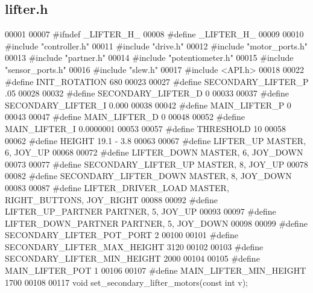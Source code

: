 \subsection{lifter.\+h}
\label{a00026_source}

\begin{DoxyCode}
00001 
00007 \textcolor{preprocessor}{#ifndef \_LIFTER\_H\_}
00008 \textcolor{preprocessor}{#define \_LIFTER\_H\_}
00009 
00010 \textcolor{preprocessor}{#include "controller.h"}
00011 \textcolor{preprocessor}{#include "drive.h"}
00012 \textcolor{preprocessor}{#include "motor_ports.h"}
00013 \textcolor{preprocessor}{#include "partner.h"}
00014 \textcolor{preprocessor}{#include "potentiometer.h"}
00015 \textcolor{preprocessor}{#include "sensor_ports.h"}
00016 \textcolor{preprocessor}{#include "slew.h"}
00017 \textcolor{preprocessor}{#include <API.h>}
00018 
00022 \textcolor{preprocessor}{#define INIT\_ROTATION 680}
00023 
00027 \textcolor{preprocessor}{#define SECONDARY\_LIFTER\_P .05}
00028 
00032 \textcolor{preprocessor}{#define SECONDARY\_LIFTER\_D 0}
00033 
00037 \textcolor{preprocessor}{#define SECONDARY\_LIFTER\_I 0.000}
00038 
00042 \textcolor{preprocessor}{#define MAIN\_LIFTER\_P 0}
00043 
00047 \textcolor{preprocessor}{#define MAIN\_LIFTER\_D 0}
00048 
00052 \textcolor{preprocessor}{#define MAIN\_LIFTER\_I 0.0000001}
00053 
00057 \textcolor{preprocessor}{#define THRESHOLD 10}
00058 
00062 \textcolor{preprocessor}{#define HEIGHT 19.1 - 3.8}
00063 
00067 \textcolor{preprocessor}{#define LIFTER\_UP MASTER, 6, JOY\_UP}
00068 
00072 \textcolor{preprocessor}{#define LIFTER\_DOWN MASTER, 6, JOY\_DOWN}
00073 
00077 \textcolor{preprocessor}{#define SECONDARY\_LIFTER\_UP MASTER, 8, JOY\_UP}
00078 
00082 \textcolor{preprocessor}{#define SECONDARY\_LIFTER\_DOWN MASTER, 8, JOY\_DOWN}
00083 
00087 \textcolor{preprocessor}{#define LIFTER\_DRIVER\_LOAD MASTER, RIGHT\_BUTTONS, JOY\_RIGHT}
00088 
00092 \textcolor{preprocessor}{#define LIFTER\_UP\_PARTNER PARTNER, 5, JOY\_UP}
00093 
00097 \textcolor{preprocessor}{#define LIFTER\_DOWN\_PARTNER PARTNER, 5, JOY\_DOWN}
00098 
00099 \textcolor{preprocessor}{#define SECONDARY\_LIFTER\_POT\_PORT 2}
00100 
00101 \textcolor{preprocessor}{#define SECONDARY\_LIFTER\_MAX\_HEIGHT 3120}
00102 
00103 \textcolor{preprocessor}{#define SECONDARY\_LIFTER\_MIN\_HEIGHT 2000}
00104 
00105 \textcolor{preprocessor}{#define MAIN\_LIFTER\_POT 1}
00106 
00107 \textcolor{preprocessor}{#define MAIN\_LIFTER\_MIN\_HEIGHT 1700}
00108 
00117 \textcolor{keywordtype}{void} set_secondary_lifter_motors(\textcolor{keyword}{const} \textcolor{keywordtype}{int} v);

\end{DoxyCode}

